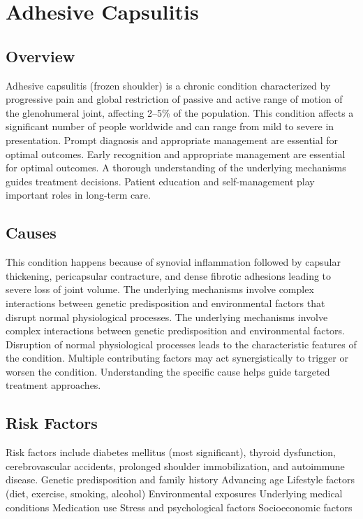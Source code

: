 \chapter{Adhesive Capsulitis}
\label{sec:Adhesive Capsulitis}

\section{Overview}
Adhesive capsulitis (frozen shoulder) is a chronic condition characterized by progressive pain and global restriction of passive and active range of motion of the glenohumeral joint, affecting 2--5\% of the population. This condition affects a significant number of people worldwide and can range from mild to severe in presentation. Prompt diagnosis and appropriate management are essential for optimal outcomes. Early recognition and appropriate management are essential for optimal outcomes. A thorough understanding of the underlying mechanisms guides treatment decisions. Patient education and self-management play important roles in long-term care.
\section{Causes}
This condition happens because of synovial inflammation followed by capsular thickening, pericapsular contracture, and dense fibrotic adhesions leading to severe loss of joint volume. The underlying mechanisms involve complex interactions between genetic predisposition and environmental factors that disrupt normal physiological processes. The underlying mechanisms involve complex interactions between genetic predisposition and environmental factors. Disruption of normal physiological processes leads to the characteristic features of the condition. Multiple contributing factors may act synergistically to trigger or worsen the condition. Understanding the specific cause helps guide targeted treatment approaches.
\section{Risk Factors}
Risk factors include diabetes mellitus (most significant), thyroid dysfunction, cerebrovascular accidents, prolonged shoulder immobilization, and autoimmune disease. Genetic predisposition and family history Advancing age Lifestyle factors (diet, exercise, smoking, alcohol) Environmental exposures Underlying medical conditions Medication use Stress and psychological factors Socioeconomic factors

